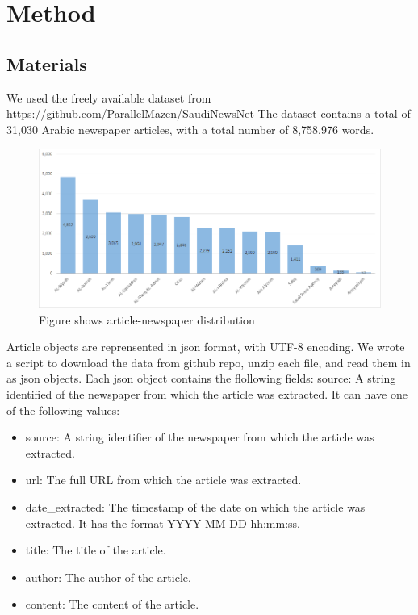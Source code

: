 \documentclass[12pt]{article}
\begin{document}
\section{Method}\label{method}
\subsection{Materials}
We used the freely available dataset from
\url{https://github.com/ParallelMazen/SaudiNewsNet} The dataset contains
a total of 31,030 Arabic newspaper articles, with a total number of 8,758,976 words. 

\begin{figure}[h!]
\centering
\includegraphics[width=\textwidth]{figures/article-newspaper_distribution.png}
\caption{Figure shows article-newspaper distribution}
\end{figure}

Article objects are reprensented in json format, with UTF-8 encoding. We wrote a script to download the data from
github repo, unzip each file, and read them in as json objects. Each json object 
contains the flollowing fields:
source: A string identified of the newspaper from which the article was extracted. It can have one of the following values:
\begin{itemize}
\item source: A string identifier of the newspaper from which the article was extracted.
\item url: The full URL from which the article was extracted.
\item date\_extracted: The timestamp of the date on which the article was extracted. It has the format YYYY-MM-DD hh:mm:ss. 
\item title: The title of the article. 
\item author: The author of the article.
\item content: The content of the article.
\end{itemize}
\end{document}
